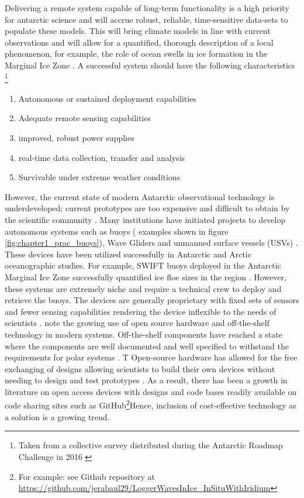 Delivering a remote system capable of long-term functionality is a high priority for antarctic science\cite{kennicutt2016delivering} and will accrue robust, reliable, time-sensitive data-sets to populate these models. This will bring climate models in line with current observations and will allow for a quantified, thorough description of a local phenomenon, for example, the role of ocean swells in ice formation in the Marginal Ice Zone \cite{doble2013wave}. A successful system should have the following characteristics \footnote{Taken from a collective survey distributed during the Antarctic Roadmap Challenge in 2016 \cite{kennicutt2016delivering}} 
\begin{enumerate}

    \item Autonomous or sustained deployment capabilities
    \item Adequate remote sensing capabilities
    \item improved, robust power supplies
    \item real-time data collection, transfer and analysis
    \item Survivable under extreme weather conditions
\end{enumerate}

However, the current state of  modern Antarctic observational technology is underdeveloped; current prototypes are too expensive and difficult to obtain by the scientific community \cite{kennicutt2016delivering}. Many institutions have initiated projects to develop autonomous systems such as buoys ( examples shown in figure \ref{fig:chapter1_prac_buoys}), Wave Gliders \cite{swart2015seasonal} and unmanned surface vessels (USVs) \cite{swart2020submesoscale}. These devices have been utilized successfully in Antarctic and Arctic oceanographic studies. For example, SWIFT buoys deployed in the Antarctic Marginal Ice Zone successfully quantified ice floe sizes in the region \cite{alberello2019brief}. However, these systems are extremely niche and require a technical crew to deploy and retrieve the buoys. The devices are generally proprietary with fixed sets of sensors and fewer sensing capabilities rendering the device inflexible to the needs of scientists \cite{rabault2017measurements}. \textcite{rabault2019open} note the growing use of open source hardware and off-the-shelf technology in modern systems. Off-the-shelf components have reached a state where the components are well documented and well specified to withstand the requirements for polar systems \cite{rabault2019open}. T Open-source hardware has allowed for the free exchanging of designs allowing scientists to build their own devices without needing to design and test prototypes \cite{rabault2019open}. As a result, there has been a growth in literature on open access devices with designs and code bases readily available on code sharing sites such as GitHub\footnote{For example: see \textcite{rabault2019open} Github repository at \url{https://github.com/jerabaul29/LoggerWavesInIce_InSituWithIridium}}Hence, inclusion of cost-effective technology as a solution is a growing trend. \par 

